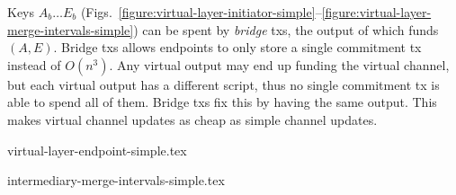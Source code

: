   Keys $A_b \dots E_b$
  (Figs.~\ref{figure:virtual-layer-initiator-simple}--\ref{figure:virtual-layer-merge-intervals-simple}) can be
  spent by \emph{bridge} txs, the output of which funds $(A, E)$.
  Bridge txs allows endpoints to only store a single commitment tx instead of $O(n^3)$.
  Any virtual output may end up funding the virtual channel, but each
  virtual output has a different script, thus no single
  commitment tx is able to spend all of them. Bridge txs fix this by having the
  same output. This makes virtual channel updates as cheap as simple channel
  updates.

  \addtolength{\intextsep}{-15pt}
  \begin{figure*}[!htbp]
    \begin{minipage}{.48\textwidth}
%
%
    {virtual-layer-endpoint-simple.tex}
    \caption{$A$--$E$ virtual channel: $A$'s initiator transaction. Spends the
    funding output of the $A$--$B$ channel. $A$ can use it if $B$ has not published
    a virtual transaction.}
    \label{figure:virtual-layer-endpoint-simple}
%
    \end{minipage}\hspace{10pt}%
    \begin{minipage}{.49\textwidth}
%
%
    {intermediary-merge-intervals-simple.tex}
    \caption{$A$--$E$ virtual channel: One of $B$'s merge intervals
    transactions. Spends the virtual outputs of $A$'s and $C$'s virtual
    transactions. $B$ can use it if both $A$ and $C$ have already published
    their initiator or extend-interval transactions.}
    \label{figure:virtual-layer-merge-intervals-simple}
%
    \end{minipage}
  \end{figure*}
  \addtolength{\intextsep}{15pt}

